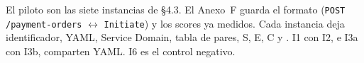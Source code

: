 El piloto son las siete instancias de §4.3. El Anexo~F guarda el formato
(\texttt{POST /payment-orders} $\leftrightarrow$ \texttt{Initiate}) y los scores ya medidos.
Cada instancia deja identificador, YAML, Service Domain, tabla de pares, S, E, C y
\AlignmentScore{}. I1 con I2, e I3a con I3b, comparten YAML. I6 es el control negativo.
